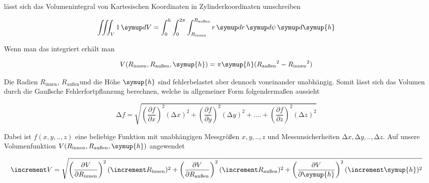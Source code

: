 \begin{flushleft}
lässt sich das Volumenintegral von Kartesischen Koordinaten in Zylinderkoordinaten umschreiben
\end{flushleft}
\begin{equation}
\iiint_V 1 \dif{V} = \int_0^{h}\int_0^{2\pi}\int_{R_\text{innen}}^{R_\text{außen}} r \dif{r}\dif{\psi}\dif{\symup{h}} 
\end{equation}

\begin{flushleft}
Wenn man das integriert erhält man
\end{flushleft}
\begin{equation}
V(R_\text{innen}, R_\text{außen}, \symup{h}) = \pi \symup{h} ({R_\text{außen}}^2 - {R_\text{innen}}^2)
\label{eqn:Volumenfunktion}
\end{equation}

\begin{flushleft}
Die Radien $R_\text{innen}$, $R_\text{außen}$und die Höhe $\symup{h}$ sind fehlerbelastet aber dennoch voneinander unabhängig. Somit
lässt sich das Volumen durch die Gaußsche Fehlerfortpflanzung berechnen, welche in allgemeiner Form folgendermaßen aussieht
\end{flushleft}
\begin{equation}
\increment f = \sqrt{\left(\frac{\partial f}{\partial x}\right)^2 (\increment x)^2 + \left(\frac{\partial f}{\partial y}\right)^2 (\increment y)^2 + ....
 + \left(\frac{\partial f}{\partial z}\right)^2 (\increment z)^2}
\label{eqn:gaussfehlerallg}
\end{equation}

\begin{flushleft}
Dabei ist $f(x,y,..,z)$ eine beliebige Funktion mit unabhängigen Messgrößen $x,y,..,z$ und Messunsicherheiten $\increment x, \increment y, ..,\increment z$.
Auf unsere Volumenfunktion $V(R_\text{innen}, R_\text{außen}, \symup{h})$ angewendet 
\end{flushleft}
\begin{equation}
\increment V = \sqrt{\left(\frac{\partial V}{\partial R_\text{innen}}\right)^2 (\increment R_\text{innen})^2 +
                     \left(\frac{\partial V}{\partial R_\text{außen}}\right)^2 (\increment R_\text{außen})^2 +
                     \left(\frac{\partial V}{\partial \symup{h}}\right)^2 (\increment \symup{h})^2}
\end{equation}


